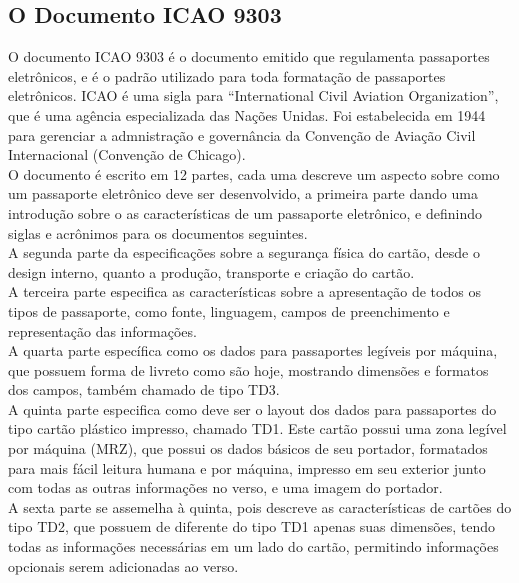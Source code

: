 \documentclass{article}
\begin{document}
	\subsection{O Documento ICAO 9303\cite{ICAO}}
		\begin{justify}
			
				\hspace*{2cm} O documento ICAO 9303 é o documento emitido que regulamenta passaportes eletrônicos, e é o padrão utilizado para toda formatação de passaportes eletrônicos. ICAO é uma sigla para “International Civil Aviation Organization”, que é uma agência especializada das Nações Unidas. Foi estabelecida em 1944 para gerenciar a admnistração e governância da Convenção de Aviação Civil Internacional (Convenção de Chicago). \\
    			\hspace*{2cm} O documento é escrito em 12 partes, cada uma descreve um aspecto sobre como um passaporte eletrônico deve ser desenvolvido, a primeira parte dando uma introdução sobre o as características de um passaporte eletrônico, e definindo siglas e acrônimos para os documentos seguintes.\\
    			\hspace*{2cm} A segunda parte da especificações sobre a segurança física do cartão, desde o design interno, quanto a produção, transporte e criação do cartão. \\
				\hspace*{2cm} A terceira parte especifica as características sobre a apresentação de todos os tipos de passaporte, como fonte, linguagem, campos de preenchimento e representação das informações. \\
				\hspace*{2cm} A quarta parte específica como os dados para passaportes legíveis por máquina, que possuem forma de livreto como são hoje, mostrando dimensões e formatos dos campos, também chamado de tipo TD3. \\
				\hspace*{2cm} A quinta parte especifica como deve ser o layout dos dados para passaportes do tipo cartão plástico impresso, chamado TD1. Este cartão possui uma zona legível por máquina (MRZ), que possui os dados básicos de seu portador, formatados para mais fácil leitura humana e por máquina, impresso em seu exterior junto com todas as outras informações no verso, e uma imagem do portador.\\
				\hspace*{2cm} A sexta parte se assemelha à quinta, pois descreve as características de cartões do tipo TD2, que possuem de diferente do tipo TD1 apenas suas dimensões, tendo todas as informações necessárias em um lado do cartão, permitindo informações opcionais serem adicionadas ao verso.\\

\end{justify}
\end{document}
